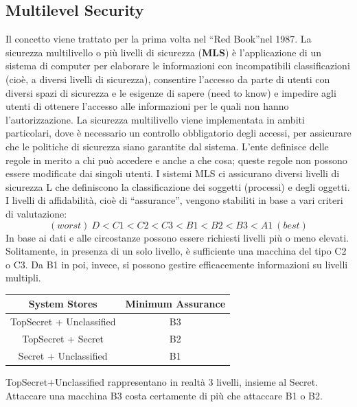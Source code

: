\subsection{Multilevel Security}
Il concetto viene trattato per la prima volta nel “Red Book”nel 1987.
La sicurezza multilivello o più livelli di sicurezza (\textbf{MLS}) è 
l'applicazione di un sistema di computer
per elaborare le informazioni con incompatibili classificazioni (cioè, a diversi 
livelli di sicurezza),
consentire l'accesso da parte di utenti con diversi spazi di sicurezza e le 
esigenze di sapere (need
to know) e impedire agli utenti di ottenere l'accesso alle informazioni per 
le quali non hanno
l'autorizzazione.
La sicurezza multilivello viene implementata in ambiti particolari, dove è 
necessario un controllo
obbligatorio degli accessi, per assicurare che le politiche di sicurezza siano 
garantite dal sistema.
L'ente definisce delle regole in merito a chi può accedere e anche a che cosa; 
queste regole non
possono essere modificate dai singoli utenti.
I sistemi MLS ci assicurano diversi livelli di sicurezza L che definiscono la 
classificazione dei
soggetti (processi) e degli oggetti. I livelli di affidabilità, cioè di 
“assurance”, vengono stabiliti in
base a vari criteri di valutazione:
\[
      (worst) \ D<C1<C2<C3<B1<B2<B3<A1 \ (best)
\]
In base ai dati e alle circostanze possono essere richiesti livelli più o meno 
elevati. Solitamente, in
presenza di un solo livello, è sufficiente una macchina del tipo C2 o C3. Da B1 
in poi, invece, si
possono gestire efficacemente informazioni su livelli multipli.
\begin{center}
      \begin{tabular}{ |c|c| }
            \hline
            \textbf{System Stores}   & \textbf{Minimum Assurance} \\
            \hline
            TopSecret + Unclassified & B3                         \\
            \hline
            TopSecret + Secret       & B2                         \\
            \hline
            Secret + Unclassified    & B1                         \\
            \hline
      \end{tabular}
\end{center}
TopSecret+Unclassified rappresentano in realtà 3 livelli, insieme al Secret.
Attaccare una macchina B3 costa certamente di più che attaccare B1 o B2.

